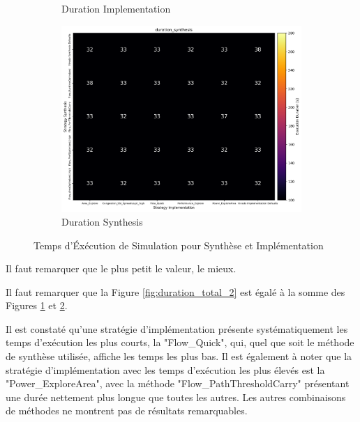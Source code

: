 \documentclass[../CSC_5RO07_TA.tex]{subfiles}
\begin{document}
\begin{figure}[h]
\begin{subfigure}[b]{0.30\textwidth}
        \caption{Duration Implementation}
        \label{fig:duration_implementation_2}
    \end{subfigure}\hfill
    \begin{subfigure}[b]{0.30\textwidth}
        \centering
        \includegraphics[width=\linewidth]{images/2_duration_synthesis.png}
        \caption{Duration Synthesis}
        \label{fig:duration_synthesis_2}
    \end{subfigure}
    \caption{Temps d'Éxécution de Simulation pour Synthèse et Implémentation}
    \label{fig:duration_2}
\end{figure}
\begin{remark}
    Il faut remarquer que le plus petit le valeur, le mieux.
\end{remark}
\begin{remark}
    Il faut remarquer que la Figure \ref{fig:duration_total_2} est égalé à la somme des Figures \ref{fig:duration_implementation_2} et \ref{fig:duration_synthesis_2}.
\end{remark}
\noindent Il est constaté qu'une stratégie d'implémentation présente systématiquement les temps d'exécution les plus courts, la "Flow\_Quick", qui, quel que soit le méthode de synthèse utilisée, affiche les temps les plus bas. Il est également à noter que la stratégie d'implémentation avec les temps d'exécution les plus élevés est la "Power\_ExploreArea", avec la méthode "Flow\_PathThresholdCarry" présentant une durée nettement plus longue que toutes les autres. Les autres combinaisons de méthodes ne montrent pas de résultats remarquables.\\
\end{document}

